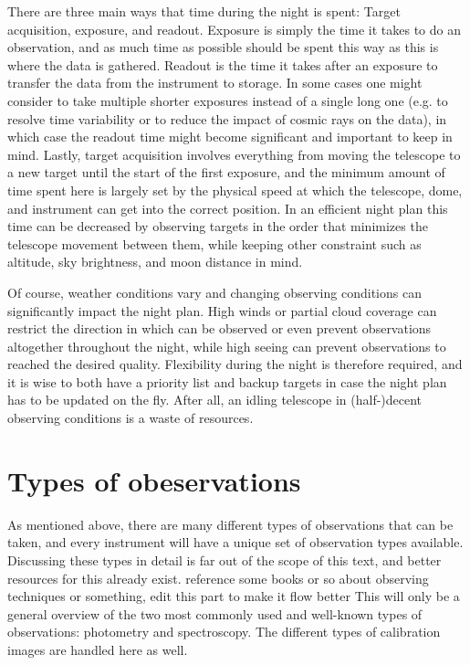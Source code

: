 \documentclass[a4paper,oneside,12pt, class=Latex/Classes/PhDthesisPSnPDF, crop=false]{standalone}
\begin{document}
There are three main ways that time during the night is spent: Target acquisition, exposure, and readout. Exposure is simply the time it takes to do an observation, and as much time as possible should be spent this way as this is where the data is gathered. Readout is the time it takes after an exposure to transfer the data from the instrument to storage. In some cases one might consider to take multiple shorter exposures instead of a single long one (e.g. to resolve time variability or to reduce the impact of cosmic rays on the data), in which case the readout time might become significant and important to keep in mind. Lastly, target acquisition involves everything from moving the telescope to a new target until the start of the first exposure, and the minimum amount of time spent here is largely set by the physical speed at which the telescope, dome, and instrument can get into the correct position. In an efficient night plan this time can be decreased by observing targets in the order that minimizes the telescope movement between them, while keeping other constraint such as altitude, sky brightness, and moon distance in mind.

Of course, weather conditions vary and changing observing conditions can significantly impact the night plan. High winds or partial cloud coverage can restrict the direction in which can be observed or even prevent observations altogether throughout the night, while high seeing can prevent observations to reached the desired quality. Flexibility during the night is therefore required, and it is wise to both have a priority list and backup targets in case the night plan has to be updated on the fly. After all, an idling telescope in (half-)decent observing conditions is a waste of resources.

\section{Types of obeservations}
As mentioned above, there are many different types of observations that can be taken, and every instrument will have a unique set of observation types available. Discussing these types in detail is far out of the scope of this text, and better resources for this already exist. \color{red} reference some books or so about observing techniques or something, edit this part to make it flow better \color{black} This will only be a general overview of the two most commonly used and well-known types of observations: photometry and spectroscopy. The different types of calibration images are handled here as well.
\end{document}
